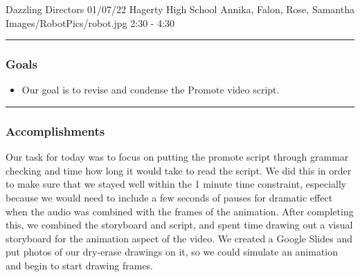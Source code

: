 \insertmeeting 
	{Dazzling Directors} 
	{01/07/22} 
	{Hagerty High School}
	{Annika, Falon, Rose, Samantha}
	{Images/RobotPics/robot.jpg}
	{2:30 - 4:30}
	
\noindent\hfil\rule{\textwidth}{.4pt}\hfil
\subsubsection*{Goals}
\begin{itemize}
    \item Our goal is to revise and condense the Promote video script.

\end{itemize} 

\noindent\hfil\rule{\textwidth}{.4pt}\hfil

\subsubsection*{Accomplishments}
Our task for today was to focus on putting the promote script through grammar checking and time how long it would take to read the script. We did this in order to make sure that we stayed well within the 1 minute time constraint, especially because we would need to include a few seconds of pauses for dramatic effect when the audio was combined with the frames of the animation. After completing this, we combined the storyboard and script, and spent time drawing out a visual storyboard for the animation aspect of the video. We created a Google Slides and put photos of our dry-erase drawings on it, so we could simulate an animation and begin to start drawing frames.
 


